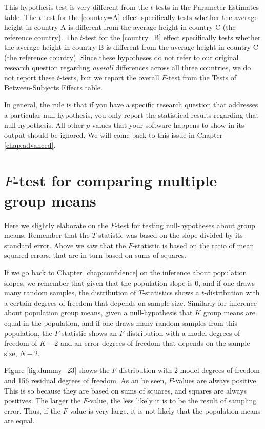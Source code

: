 \documentclass[]{book}\usepackage[]{graphicx}\usepackage[]{color}
\begin{document}
This hypothesis test is very different from the $t$-tests in the Parameter Estimates table. The $t$-test for the [country=A] effect specifically tests whether the average height in country A is different from the average height in country C (the reference country). The $t$-test for the [country=B] effect specifically tests whether the average height in country B is different from the average height in country C (the reference country). Since these hypotheses do not refer to our original research question regarding \textit{overall} differences across all three countries, we do not report these $t$-tests, but we report the overall $F$-test from the Tests of Between-Subjects Effects table.

In general, the rule is that if you have a specific research question that addresses a particular null-hypothesis, you only report the statistical results regarding that null-hypothesis. All other $p$-values that your software happens to show in its output should be ignored. We will come back to this issue in Chapter \ref{chap:advanced}.






\section{$F$-test for comparing multiple group means}

Here we slightly elaborate on the $F$-test for testing null-hypotheses about group means. Remember that the $T$-statistic was based on the slope divided by its standard error. Above we saw that the $F$-statistic is based on the ratio of mean squared errors, that are in turn based on sums of squares. 

If we go back to Chapter \ref{chap:confidence} on the inference about population slopes, we remember that given that the population slope is 0, and if one draws many random samples, the distribution of $T$-statistics shows a $t$-distribution with a certain degrees of freedom that depends on sample size. Similarly for inference about population group means, given a null-hypothesis that $K$ group means are equal in the population, and if one draws many random samples from this population, the $F$-statistic shows an $F$-distribution with a model degrees of freedom of $K-2$ and an error degrees of freedom that depends on the sample size, $N-2$.

Figure \ref{fig:dummy_23} shows the $F$-distribution with 2 model degrees of freedom and 156 residual degrees of freedom. As an be seen, $F$-values are always positive. This is so because they are based on sums of squares, and squares are always positives. The larger the $F$-value, the less likely it is to be the result of sampling error. Thus, if the $F$-value is very large, it is not likely that the population means are equal. 
\end{document}
